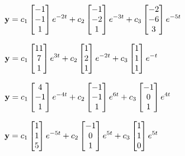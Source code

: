 \smallskip

$\mathbf{y}=\displaystyle{c_1\begin{bmatrix}-1\\-1\\1\end{bmatrix}e^{-2t}
+c_2\begin{bmatrix}-1\\-2\\1\end{bmatrix}e^{-3t}
+c_3\begin{bmatrix}-2\\-6\\3\end{bmatrix}e^{-5t}}$

\smallskip
{}
$\mathbf{y}=\displaystyle{
c_1\begin{bmatrix}11\\7\\1\end{bmatrix}e^{3t}
+c_2\begin{bmatrix}1\\2\\1\end{bmatrix}e^{-2t}
+c_3\begin{bmatrix}1\\1\\1\end{bmatrix}e^{-t}}$

\smallskip
{}
$\mathbf{y}=\displaystyle{c_1\begin{bmatrix}4\\-1\\1\end{bmatrix}e^{-4t}
+c_2\begin{bmatrix}-1\\-1\\1\end{bmatrix}e^{6t}
+c_3\begin{bmatrix}-1\\0\\1\end{bmatrix}e^{4t}}$

\smallskip
{}
$\mathbf{y}=\displaystyle{c_1\begin{bmatrix}1\\1\\5\end{bmatrix}e^{-5t}
+c_2\begin{bmatrix}-1\\0\\1\end{bmatrix}e^{5t}
+c_3\begin{bmatrix}1\\1\\0\end{bmatrix}e^{5t}}$

